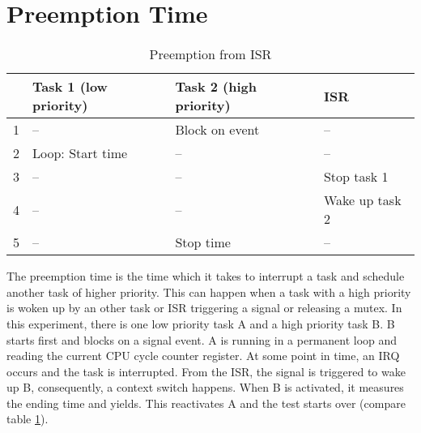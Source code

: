 \section{Preemption Time}
\begin{table}[htbp]
	\centering
		\begin{tabular}{|l|l|l|l|}
			\hline
				& Task 1 (low priority)& Task 2 (high priority)	& \ac{ISR}				\\
				\hline 
				1 & --									 & Block on event					& --							\\
			  2 & Loop: Start time		 & --											& --							\\
			  3 & --									 & --											& Stop task 1			\\
			  4 & --									 & --							 				& Wake up task 2	\\
			  5 & --									 & Stop time							& --							\\	  
			\hline
		\end{tabular}
	\caption{Preemption from ISR}
	\label{tab_preemption}
\end{table}

The preemption time is the time which it takes to interrupt a task and schedule another task of higher priority.
This can happen when a task with a high priority is woken up by an other task or \ac{ISR} triggering a signal or releasing a mutex.
In this experiment, there is one low priority task A and a high priority task B.
B starts first and blocks on a signal event.
A is running in a permanent loop and reading the current \ac{CPU} cycle counter register.
At some point in time, an \ac{IRQ} occurs and the task is interrupted.
From the \ac{ISR}, the signal is triggered to wake up B, consequently, a context switch happens.
When B is activated, it measures the ending time and yields.
This reactivates A and the test starts over (compare table \ref{tab_preemption}).

